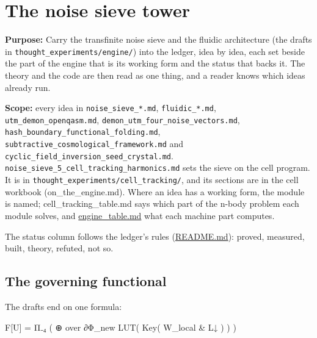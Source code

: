 \chapter{\texorpdfstring{The noise sieve tower}{The noise sieve tower}}
\label{chap:noise-sieve-tower}

\textbf{Purpose:} Carry the transfinite noise sieve and the fluidic architecture (the drafts in \texttt{thought\_\allowbreak{}experiments/\allowbreak{}engine/\allowbreak{}}) into the ledger, idea by idea, each set beside the part of the engine that is its working form and the status that backs it. The theory and the code are then read as one thing, and a reader knows which ideas already run.

\textbf{Scope:} every idea in \texttt{noise\_\allowbreak{}sieve\_\allowbreak{}*.\allowbreak{}md}, \texttt{fluidic\_\allowbreak{}*.\allowbreak{}md}, \texttt{utm\_\allowbreak{}demon\_\allowbreak{}openqasm.\allowbreak{}md}, \texttt{demon\_\allowbreak{}utm\_\allowbreak{}four\_\allowbreak{}noise\_\allowbreak{}vectors.\allowbreak{}md}, \texttt{hash\_\allowbreak{}boundary\_\allowbreak{}functional\_\allowbreak{}folding.\allowbreak{}md}, \texttt{subtractive\_\allowbreak{}cosmological\_\allowbreak{}framework.\allowbreak{}md} and \texttt{cyclic\_\allowbreak{}field\_\allowbreak{}inversion\_\allowbreak{}seed\_\allowbreak{}crystal.\allowbreak{}md}. \texttt{noise\_\allowbreak{}sieve\_\allowbreak{}5\_\allowbreak{}cell\_\allowbreak{}tracking\_\allowbreak{}harmonics.\allowbreak{}md} sets the sieve on the cell program. It is in \texttt{thought\_\allowbreak{}experiments/\allowbreak{}cell\_\allowbreak{}tracking/\allowbreak{}}, and its sections are in the cell workbook (on\_\allowbreak{}the\_\allowbreak{}engine.md). Where an idea has a working form, the module is named; cell\_\allowbreak{}tracking\_\allowbreak{}table.md says which part of the n-body problem each module solves, and \hyperref[chap:engine-table]{engine\_\allowbreak{}table.md} what each machine part computes.

The status column follows the ledger's rules (\hyperref[chap:readme]{README.md}): proved, measured, built, theory, refuted, not so.

\section{\texorpdfstring{The governing functional}{The governing functional}}

The drafts end on one formula:

F[U] = Π₋₄ ( ⊕ over ∂Φ\_\allowbreak{}new  LUT( Key( W\_\allowbreak{}local \& L↓ ) ) )

